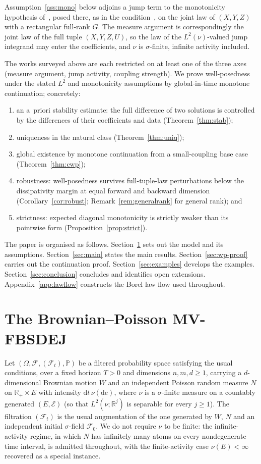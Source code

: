 \documentclass[preprint,12pt]{elsarticle}
\newcommand{\R}{\mathbb{R}}
\newcommand{\Prob}{\mathbb{P}}
\newcommand{\F}{\mathcal{F}}
\newcommand{\diff}{\mathrm{d}}
\newcommand{\Lnu}{L^2(\nu)}
\numberwithin{equation}{section}
\theoremstyle{plain}
\theoremstyle{definition}
\theoremstyle{\PaperRemarkStyle}
\begin{document}
Assumption~\ref{ass:mono} below adjoins a jump term to the monotonicity hypothesis
of~\cite[(H.1)(1)]{RSZ}, posed there, as in the condition~\cite[(A1)]{BYZ}, on the joint
law of $(X,Y,Z)$ with a rectangular full-rank $G$. The measure argument is correspondingly the joint law of the full tuple
$(X,Y,Z,U)$, so the law of the $\Lnu$-valued jump integrand may enter the coefficients, and
$\nu$ is $\sigma$-finite, infinite activity included.

The works surveyed above are each restricted
on at least one of the three axes (measure argument, jump activity, coupling strength). We
prove well-posedness under the stated $L^2$ and monotonicity assumptions by global-in-time
monotone continuation; concretely:
\begin{enumerate}[label=(\roman*)]
\item an a~priori stability estimate: the full difference of two solutions is
  controlled by the differences of their coefficients and data (Theorem~\ref{thm:stab});
\item uniqueness in the natural class (Theorem~\ref{thm:uniq});
\item global existence by monotone continuation from a small-coupling base case
  (Theorem~\ref{thm:cwp});
\item robustness: well-posedness survives full-tuple-law perturbations below the
  dissipativity margin at equal forward and backward dimension
  (Corollary~\ref{cor:robust}; Remark~\ref{rem:generalrank} for general rank); and
\item strictness: expected diagonal monotonicity is strictly weaker than its pointwise
  form (Proposition~\ref{prop:strict}).
\end{enumerate}

The paper is organised as follows. Section~\ref{sec:main-assumptions} sets out the model
and its assumptions. Section~\ref{sec:main} states the main results.
Section~\ref{sec:wp-proof} carries out the continuation proof.
Section~\ref{sec:examples} develops the examples. Section~\ref{sec:conclusion} concludes
and identifies open extensions.
Appendix~\ref{app:lawflow} constructs the Borel law flow used throughout.

 \section{The Brownian--Poisson MV-FBSDEJ}\label{sec:main-assumptions}
Let $(\Omega,\F,(\F_t),\Prob)$ be a filtered probability space satisfying the usual
conditions, over a fixed horizon $T>0$ and dimensions $n,m,d\ge1$, carrying a
$d$-dimensional Brownian motion $W$ and an independent Poisson random measure $N$ on
$\R_+\times E$ with intensity $\diff t\,\nu(\diff e)$, where $\nu$ is a
$\sigma$-finite measure on a countably generated $(E,\mathcal E)$ (so that
$L^2(\nu;\R^j)$ is separable for every $j\ge1$). The filtration $(\F_t)$ is the usual augmentation of the one generated by $W$,
$N$ and an independent initial $\sigma$-field $\F_0$.
We do not require $\nu$ to be finite: the infinite-activity regime,
in which $N$ has infinitely many atoms on every nondegenerate time interval, is admitted
throughout, with the finite-activity case $\nu(E)<\infty$ recovered as a special instance.
\end{document}
